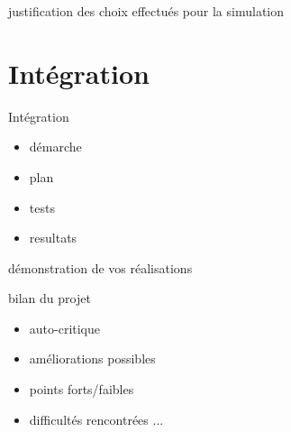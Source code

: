 \documentclass{beamer}
\begin{document}
	\begin{frame}
		justification des choix effectués pour la simulation 
	\end{frame}

\section{Intégration}
	\begin{frame}
		Intégration
		\begin{itemize}
			\item démarche
			\item plan
			\item tests
			\item resultats
		\end{itemize}
	\end{frame}

	\begin{frame}
		démonstration de vos réalisations
	\end{frame}

	\begin{frame}
		bilan du projet
		\begin{itemize}
			\item auto-critique
			\item améliorations possibles
			\item points forts/faibles
			\item difficultés rencontrées ...
		\end{itemize}
	\end{frame}
\end{document}
